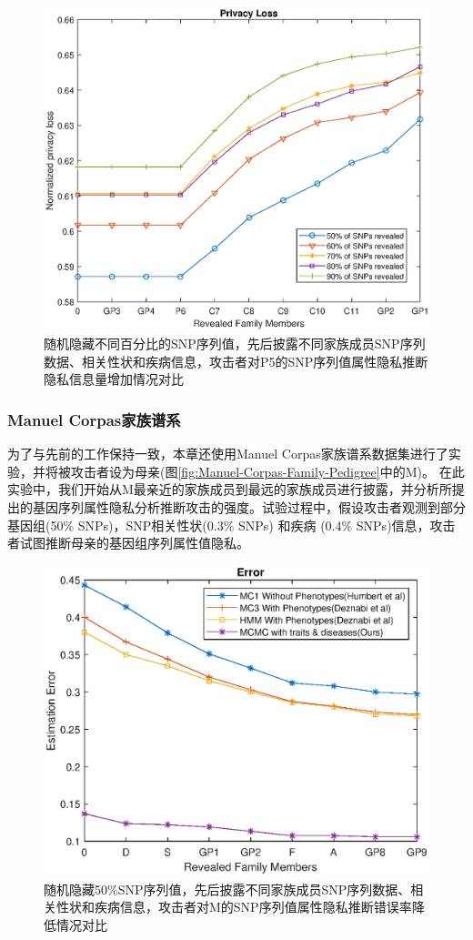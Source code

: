 \begin{figure}[htbp]
	\centering
	\includegraphics[width=0.8\linewidth]{./figures/P5privacyloss3.eps}
	\centering
	\caption{随机隐藏不同百分比的SNP序列值，先后披露不同家族成员SNP序列数据、相关性状和疾病信息，攻击者对P5的SNP序列值属性隐私推断隐私信息量增加情况对比}\label{fig:P5privacyloss3}
\end{figure}


\subsubsection{Manuel Corpas家族谱系}

为了与先前的工作保持一致，本章还使用Manuel Corpas家族谱系数据集进行了实验，并将被攻击者设为母亲(图\ref{fig:Manuel-Corpas-Family-Pedigree}中的M)。 在此实验中，我们开始从M最亲近的家族成员到最远的家族成员进行披露，并分析所提出的基因序列属性隐私分析推断攻击的强度。试验过程中，假设攻击者观测到部分基因组(50\% SNPs)，SNP相关性状(0.3\% SNPs) 和疾病 (0.4\% SNPs)信息，攻击者试图推断母亲的基因组序列属性值隐私。

\begin{figure}[htbp]
	\centering
	\includegraphics[width=0.8\linewidth]{./figures/Merror1.eps}
	\centering
	\caption{随机隐藏50\%SNP序列值，先后披露不同家族成员SNP序列数据、相关性状和疾病信息，攻击者对M的SNP序列值属性隐私推断错误率降低情况对比}\label{fig:Merror1}
\end{figure}



